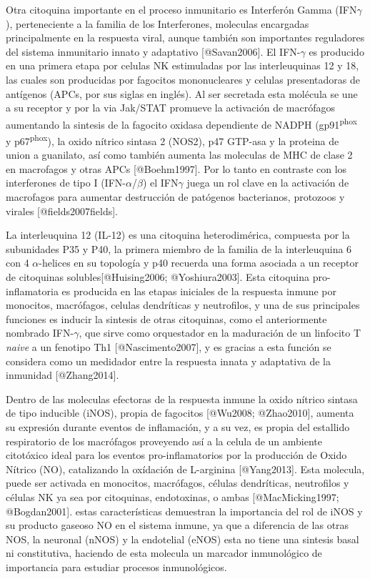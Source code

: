 Otra citoquina importante en el proceso inmunitario es Interferón Gamma (IFN$\gamma$), perteneciente a la familia de los Interferones, moleculas encargadas principalmente en la respuesta viral, aunque también son importantes reguladores del sistema inmunitario innato y adaptativo [@Savan2006].  El IFN-$\gamma$ es producido en una primera etapa por celulas NK estimuladas por las interleuquinas 12 y 18, las cuales son producidas por fagocitos mononucleares y celulas presentadoras de antígenos (APCs, por sus siglas en inglés). Al ser secretada esta molécula se une a su receptor y por la via Jak/STAT promueve la activación de macrófagos aumentando la sintesis de la fagocito oxidasa dependiente de NADPH (\si{gp91^{phox}} y \si{p67^{phox}}), la oxido nítrico sintasa 2 (NOS2), p47 GTP-asa y la proteina de union a guanilato, así como también aumenta las moleculas de MHC de clase 2 en macrofagos y otras APCs [@Boehm1997]. Por lo tanto en contraste con los interferones de tipo I (IFN-$\alpha$/$\beta$) el IFN$\gamma$ juega un rol clave en la activación de macrofagos para aumentar destrucción de patógenos bacterianos, protozoos y virales [@fields2007fields].

La interleuquina 12 (IL-12) es una citoquina heterodimérica, compuesta por la subunidades P35 y P40, la primera miembro de la familia de la interleuquina 6 con 4 $\alpha$-helices en su topología y p40 recuerda una forma asociada a un receptor de citoquinas solubles[@Huising2006; @Yoshiura2003]. Esta citoquina pro-inflamatoria es producida en las etapas iniciales de la respuesta inmune por monocitos, macrófagos, celulas dendríticas y neutrofilos, y una de sus principales funciones es inducir la sintesis de otras citoquinas, como el anteriormente nombrado IFN-$\gamma$, que sirve como orquestador en la maduración de un linfocito T \emph{naive} a un fenotipo Th1 [@Nascimento2007], y es gracias a esta función se considera como un medidador entre la respuesta innata y adaptativa de la inmunidad [@Zhang2014].

Dentro de las moleculas efectoras de la respuesta inmune la oxido nítrico sintasa de tipo inducible (iNOS), propia de fagocitos [@Wu2008; @Zhao2010],  aumenta su expresión durante eventos de inflamación, y a su vez, es propia del estallido respiratorio de los macrófagos proveyendo así a la celula de un ambiente citotóxico ideal para los eventos pro-inflamatorios por la producción de Oxido Nítrico (NO), catalizando la oxídación de L-arginina [@Yang2013]. Esta molecula, puede ser activada en monocitos, macrófagos, células dendríticas, neutrofilos y células NK ya sea por citoquinas, endotoxinas, o ambas [@MacMicking1997; @Bogdan2001]. estas características demuestran  la importancia del rol de iNOS y su producto gaseoso NO en el sistema inmune, ya que a diferencia de las otras NOS, la neuronal (nNOS) y la endotelial (eNOS) esta no tiene una sintesis basal ni constitutiva, haciendo de esta molecula un marcador inmunológico de importancia para estudiar procesos inmunológicos.

